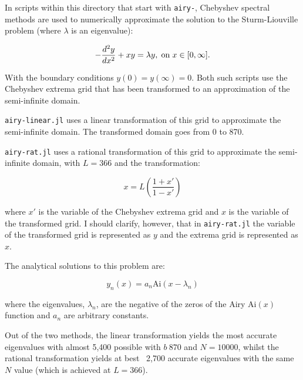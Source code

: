 \documentclass[12pt,a4paper,openright]{article}
\begin{document}
	In scripts within this directory that start with \texttt{airy-}, Chebyshev spectral methods are used to numerically approximate the solution to the Sturm-Liouville problem (where $\lambda$ is an eigenvalue):

	\[
	- \dfrac{d^2 y}{dx^2} + xy = \lambda y, \hspace{0.1cm}\mathrm{on} \hspace{0.1cm} x\in[0,\infty].
	\]

	With the boundary conditions $y(0)=y(\infty)=0$. Both such scripts use the Chebyshev extrema grid that has been transformed to an approximation of the semi-infinite domain. 

	\texttt{airy-linear.jl} uses a linear transformation of this grid to approximate the semi-infinite domain. The transformed domain goes from 0 to 870.
	
	\texttt{airy-rat.jl} uses a rational transformation of this grid to approximate the semi-infinite domain, with $L=366$ and the transformation:
	
	\[
	x = L \left(\dfrac{1+x'}{1-x'}\right)
	\]

	where $x'$ is the variable of the Chebyshev extrema grid and $x$ is the variable of the transformed grid. I should clarify, however, that in \texttt{airy-rat.jl} the variable of the transformed grid is represented as $ y $ and the extrema grid is represented as $ x $. 
	
	The analytical solutions to this problem are:

	\[
	y_n(x) = a_n \mathrm{Ai}(x-\lambda_n)
	\]

	where the eigenvalues, $\lambda_n$, are the negative of the zeros of the Airy $\mathrm{Ai}(x)$ function and $a_n$ are arbitrary constants.

	Out of the two methods, the linear transformation yields the most accurate eigenvalues with almost 5,400 possible with $b~870$ and $N=10000$, whilst the rational transformation yields at best ~2,700 accurate eigenvalues with the same $N$ value (which is achieved at $L=366$). 
\end{document}
